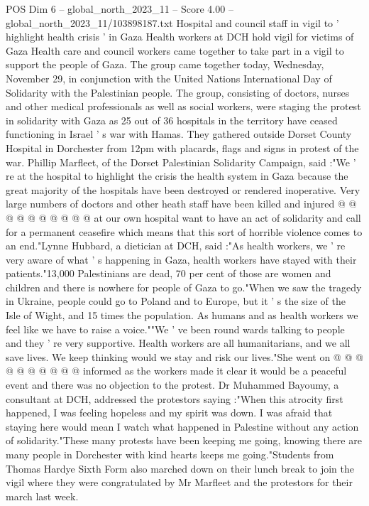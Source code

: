 \begin{textsample}{POS Dim 6 – global\_north\_2023\_11 – Score 4.00 – global\_north\_2023\_11/103898187.txt}  \label{ex:f6_pos_218}
Hospital and council staff in vigil to ' highlight health crisis ' in Gaza Health workers at DCH hold vigil for victims of Gaza Health care and council workers came together to take part in a vigil to support the people of Gaza.
The group came together today, Wednesday, November 29, in conjunction with the United Nations International Day of Solidarity with the Palestinian people.
The group, consisting of doctors, nurses and other medical professionals as well as social workers, were staging the protest in solidarity with Gaza as 25 out of 36 hospitals in the territory have ceased functioning in Israel ' s war with Hamas.
They gathered outside Dorset County Hospital in Dorchester from 12pm with placards, flags and signs in protest of the war.
Phillip Marfleet, of the Dorset Palestinian Solidarity Campaign, said :"We ' re at the hospital to highlight the crisis the health system in Gaza because the great majority of the hospitals have been destroyed or rendered inoperative.
Very large numbers of doctors and other heath staff have been killed and injured @ @ @ @ @ @ @ @ @ @ at our own hospital want to have an act of solidarity and call for a permanent ceasefire which means that this sort of horrible violence comes to an end."Lynne Hubbard, a dietician at DCH, said :"As health workers, we ' re very aware of what ' s happening in Gaza, health workers have stayed with their patients."13,000 Palestinians are dead, 70 per cent of those are women and children and there is nowhere for people of Gaza to go."When we saw the tragedy in Ukraine, people could go to Poland and to Europe, but it ' s the size of the Isle of Wight, and 15 times the population.
As humans and as health workers we feel like we have to raise a voice.""We ' ve been round wards talking to people and they ' re very supportive.
Health workers are all humanitarians, and we all save lives.
We keep thinking would we stay and risk our lives."She went on @ @ @ @ @ @ @ @ @ @ informed as the workers made it clear it would be a peaceful event and there was no objection to the protest.
Dr Muhammed Bayoumy, a consultant at DCH, addressed the protestors saying :"When this atrocity first happened, I was feeling hopeless and my spirit was down.
I was afraid that staying here would mean I watch what happened in Palestine without any action of solidarity."These many protests have been keeping me going, knowing there are many people in Dorchester with kind hearts keeps me going."Students from Thomas Hardye Sixth Form also marched down on their lunch break to join the vigil where they were congratulated by Mr Marfleet and the protestors for their march last week.

\end{textsample}
